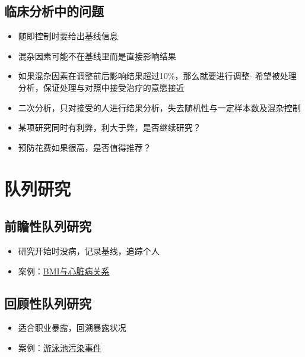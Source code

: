 \documentclass[]{book}
\providecommand{\tightlist}{%
  \setlength{\itemsep}{0pt}\setlength{\parskip}{0pt}}
\begin{document}
\hypertarget{ux4e34ux5e8aux5206ux6790ux4e2dux7684ux95eeux9898}{%
\subsection{临床分析中的问题}\label{ux4e34ux5e8aux5206ux6790ux4e2dux7684ux95eeux9898}}

\begin{itemize}
\tightlist
\item
  随即控制时要给出基线信息
\item
  混杂因素可能不在基线里而是直接影响结果
\item
  如果混杂因素在调整前后影响结果超过10\%，那么就要进行调整- 希望被处理分析，保证处理与对照中接受治疗的意愿接近
\item
  二次分析，只对接受的人进行结果分析，失去随机性与一定样本数及混杂控制
\item
  某项研究同时有利弊，利大于弊，是否继续研究？
\item
  预防花费如果很高，是否值得推荐？
\end{itemize}

\hypertarget{ux961fux5217ux7814ux7a76}{%
\section{队列研究}\label{ux961fux5217ux7814ux7a76}}

\hypertarget{ux524dux77bbux6027ux961fux5217ux7814ux7a76}{%
\subsection{前瞻性队列研究}\label{ux524dux77bbux6027ux961fux5217ux7814ux7a76}}

\begin{itemize}
\tightlist
\item
  研究开始时没病，记录基线，追踪个人
\item
  案例：\href{http://www.ncbi.nlm.nih.gov/pubmed/7654270}{BMI与心脏病关系}
\end{itemize}

\hypertarget{ux56deux987eux6027ux961fux5217ux7814ux7a76}{%
\subsection{回顾性队列研究}\label{ux56deux987eux6027ux961fux5217ux7814ux7a76}}

\begin{itemize}
\tightlist
\item
  适合职业暴露，回溯暴露状况
\item
  案例：\href{http://www.cdc.gov/parasites/giardia/}{游泳池污染事件}
\end{itemize}
\end{document}
